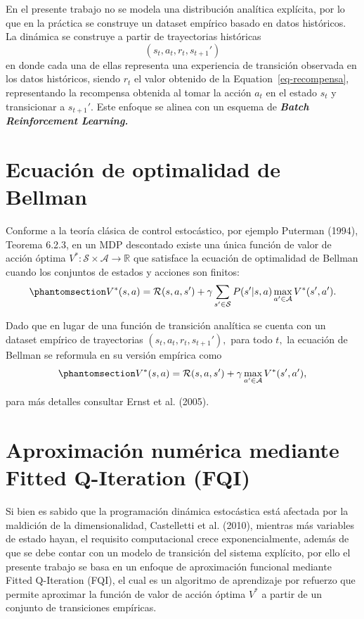 \documentclass[
  letterpaper,
  DIV=11,
  numbers=noendperiod]{scrreprt}
\theoremstyle{definition}
\theoremstyle{remark}
\begin{document}
En el presente trabajo no se modela una distribución analítica
explícita, por lo que en la práctica se construye un dataset empírico
basado en datos históricos. La dinámica se construye a partir de
trayectorias históricas \[(s_t, a_t, r_t, s_{t+1}')\] en donde cada una
de ellas representa una experiencia de transición observada en los datos
históricos, siendo \(r_t\) el valor obtenido de la
Equation~\ref{eq-recompensa}, representando la recompensa obtenida al
tomar la acción \(a_t\) en el estado \(s_t\) y transicionar a
\(s_{t+1}'\). Este enfoque se alinea con un esquema de
\textbf{\emph{Batch Reinforcement Learning.}}

\section{Ecuación de optimalidad de
Bellman}\label{ecuaciuxf3n-de-optimalidad-de-bellman}

Conforme a la teoría clásica de control estocástico, por ejemplo
Puterman (1994), Teorema 6.2.3, en un MDP descontado existe una única
función de valor de acción óptima
\(V^*:\mathcal{S}\times\mathcal{A} \to \mathbb{R}\) que satisface la
ecuación de optimalidad de Bellman cuando los conjuntos de estados y
acciones son finitos:
\begin{equation}\protect\phantomsection\label{eq-bellman}{V^*(s,a) = \mathcal{R}(s,a,s') + \gamma \sum_{s'\in \mathcal{S}} P(s'|s,a) \max_{a' \in \mathcal{A}} V^*(s',a').}\end{equation}

Dado que en lugar de una función de transición analítica se cuenta con
un dataset empírico de trayectorias \((s_t, a_t, r_t, s_{t+1}'),\) para
todo \(t,\) la ecuación de Bellman se reformula en su versión empírica
como
\begin{equation}\protect\phantomsection\label{eq-bellman-empirica}{V^*(s,a) = \mathcal{R}(s,a,s') + \gamma \max_{a' \in \mathcal{A}} V^*(s',a'),}\end{equation}

para más detalles consultar Ernst et al. (2005).

\section{Aproximación numérica mediante Fitted Q-Iteration
(FQI)}\label{aproximaciuxf3n-numuxe9rica-mediante-fitted-q-iteration-fqi}

Si bien es sabido que la programación dinámica estocástica está afectada
por la maldición de la dimensionalidad, Castelletti et al. (2010),
mientras más variables de estado hayan, el requisito computacional crece
exponencialmente, además de que se debe contar con un modelo de
transición del sistema explícito, por ello el presente trabajo se basa
en un enfoque de aproximación funcional mediante Fitted Q-Iteration
(FQI), el cual es un algoritmo de aprendizaje por refuerzo que permite
aproximar la función de valor de acción óptima \(V^*\) a partir de un
conjunto de transiciones empíricas.
\end{document}
